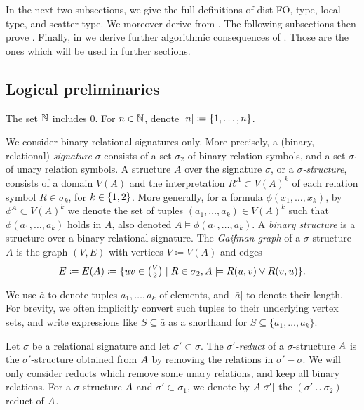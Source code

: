 In the next two subsections, we give the full definitions of dist-FO,
type, local type, and scatter type.
We moreover derive  from .
The following subsections then prove .
Finally, in  we derive further algorithmic consequences of
. Those are the ones which will be used 
in further sections. 

\subsection{Logical preliminaries}
The set $\mathbb N$ includes $0$. For $n\in\mathbb N$, denote $[n]\coloneqq\{1,\ldots,n\}$.

We consider binary relational signatures only.
More precisely, a (binary, relational) \emph{signature} $\sigma$ consists of a set $\sigma_2$ of binary relation symbols, and a set $\sigma_1$ of unary relation symbols. A structure $A$ over the signature $\sigma$,
 or a \emph{$\sigma$-structure}, consists of a domain $V(A)$ and the interpretation 
  $R^A\subset V(A)^k$ of each relation symbol $R\in \sigma_k$, for $k\in\{1,2\}$.
More generally, for a formula $\phi(x_1,\ldots,x_k)$, by $\phi^A\subset V(A)^k$ we denote the 
set of tuples $(a_1,\ldots,a_k)\in V(A)^k$ such that $\phi(a_1,\ldots,a_k)$ holds in $A$, also denoted $A\models\phi(a_1,\ldots,a_k)$.
A \emph{binary structure} is a structure over a binary relational signature.
The \emph{Gaifman graph} of a $\sigma$-structure $A$ is the graph $(V,E)$ with vertices $V\coloneqq V(A)$ and edges 
$$E \coloneqq E(A)\coloneqq \{uv\in \mbox{$V\choose 2$}\mid R\in\sigma_2,A\models R(u,v)\lor R(v,u)\}.$$


We use \(\bar a\) to denote tuples \(a_1,\dots,a_k\) of elements, and  \(|\bar a|\) to denote their length.
For brevity, we often implicitly convert such tuples to their underlying vertex sets,
and write expressions like \(S \subseteq \bar a\) as a shorthand for \(S \subseteq \{a_1,\dots,a_k\}\).

Let $\sigma$ be a relational signature and let $\sigma'\subset \sigma$.
    The \emph{$\sigma'$-reduct} of a $\sigma$-structure ${{A}}$ is the $\sigma'$-structure 
    obtained from ${{A}}$ by removing the relations in $\sigma'-\sigma$.
    We will only consider reducts which remove some unary relations, and keep all binary relations. For a $\sigma$-structure ${{A}}$ and $\sigma'\subset\sigma_1$, we denote by ${{A}}[\sigma']$ the $(\sigma'\cup\sigma_2)$-reduct of ${{A}}$.

